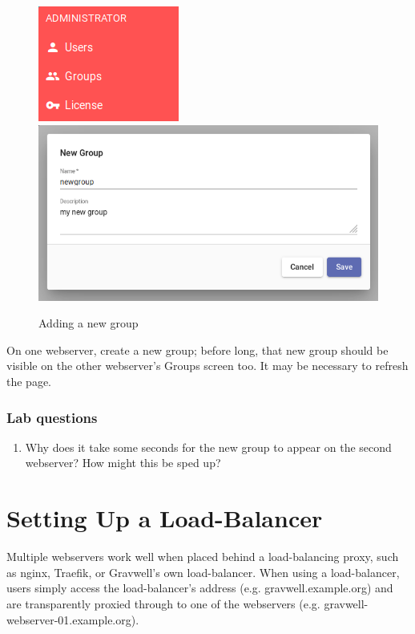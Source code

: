 \begin{figure}
\includegraphics[width=0.4\linewidth]{images/groups-menu.png}\includegraphics[width=0.5\linewidth]{images/groups-new.png}
\caption{Adding a new group}
\label{fig:webserver-lab-newgroup}
\end{figure}

On one webserver, create a new group; before long, that new group
should be visible on the other webserver's Groups screen too. It may be
necessary to refresh the page.

\subsubsection{Lab questions}

\begin{enumerate}
\item
  Why does it take some seconds for the new group to appear on the
  second webserver? How might this be sped up?
\end{enumerate}

\section{Setting Up a Load-Balancer}

Multiple webservers work well when placed behind a load-balancing
proxy, such as nginx, Traefik, or Gravwell's own load-balancer. 
When using a load-balancer, users simply access
the load-balancer's address (e.g. gravwell.example.org) and are
transparently proxied through to one of the webservers (e.g.
gravwell-webserver-01.example.org).


